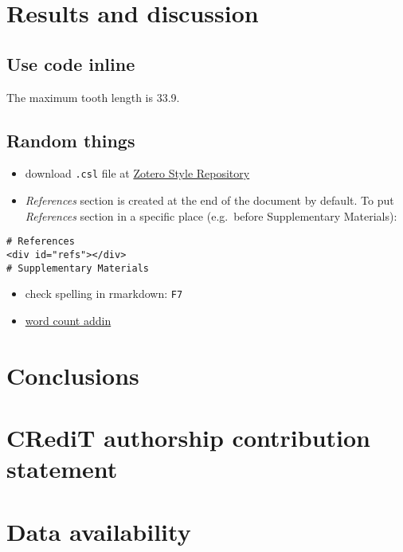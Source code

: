 \documentclass[]{elsarticle} %
\providecommand{\tightlist}{%
  \setlength{\itemsep}{0pt}\setlength{\parskip}{0pt}}
\begin{document}
\section{Results and discussion}\label{result}

\subsection{Use code inline}\label{use-code-inline}

The maximum tooth length is 33.9.

\subsection{Random things}\label{random-things}

\begin{itemize}
\tightlist
\item
  download \texttt{.csl} file at
  \href{https://www.zotero.org/styles}{Zotero Style Repository}
\item
  \emph{References} section is created at the end of the document by
  default. To put \emph{References} section in a specific place
  (e.g.~before Supplementary Materials):
\end{itemize}

\begin{verbatim}
# References
<div id="refs"></div>
# Supplementary Materials
\end{verbatim}

\begin{itemize}
\tightlist
\item
  check spelling in rmarkdown: \texttt{F7}
\item
  \href{https://github.com/benmarwick/wordcountaddin}{word count addin}
\end{itemize}

\section{Conclusions}\label{conclusion}

\section*{CRediT authorship contribution statement}\label{authorship}

\section*{Data availability}\label{datasharing}
\end{document}
